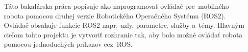Táto bakalárska práca popisuje ako naprogramovať ovládač pre~mobilného robota pomocou druhej verzie Robotického Operačného Systému (ROS2).
Ovládač obsahuje funkcie ROS2 napr. uzly, parametre, služby a~témy. Hlavným cieľom tohto projektu je vytvoriť rozhranie tak, aby
bolo možné ovládať robota pomocou jednoduchých príkazov cez~ROS.

